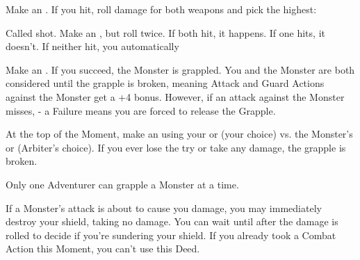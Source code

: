 \begin{multicols*}{2}
  \COMBAT [
    Name = Florentine,
    Link = combat-deeds-florentine,
    Desc = Must be attacking with two Daggers\, two Shortswords\, or a mix of both
  ]

  Make an . If you hit, roll damage for both weapons and pick the highest:


  \COMBAT [
    Name = Gambit,
    Link = combat-deeds-gambit,
    Desc = Arbiter gets to add penalties to your roll depending on how crazy it is.
  ]

  Called shot. Make an , but roll twice.  If both hit, it happens.  If one hits, it doesn't.  If neither hit, you automatically 

  \COMBAT [
    Name = Grapple,
    Link = combat-deeds-grapple,
    Desc = You must be either unarmored or in Light Armor
  ]

  Make an .  If you succeed, the Monster is grappled. You and the Monster are both considered  until the grapple is broken, meaning Attack and Guard Actions against the Monster get a +4 bonus. However, if an attack against the Monster misses, \RSTRY{\DEX} - a Failure means you are forced to release the Grapple. 

 At the top of the Moment, make an \RB using your \VIG or \DEX (your choice) vs. the Monster's  or  (Arbiter's choice). If you ever lose the \RB try or take any damage, the grapple is broken.

 Only one Adventurer can grapple a Monster at a time.

  \COMBAT [
    Name = Sunder Shield,
    Link = combat-deeds-sunder,
    Desc = Must have a shield equipped (it has to be on your arm / you have to be using it)
  ]

  If a Monster's attack is about to cause you  damage, you may immediately destroy your shield, taking no damage. You can wait until after the damage is rolled to decide if you're sundering your shield.  If you already took a Combat Action this Moment, you can't use this Deed.


\end{multicols*}
